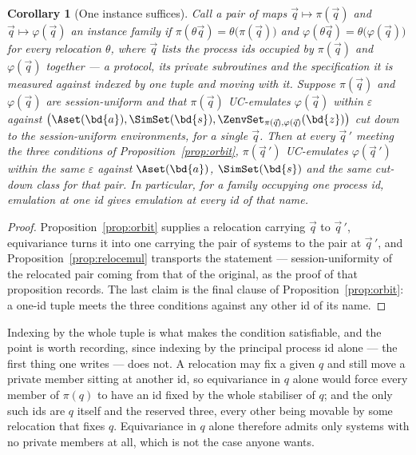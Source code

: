 \documentclass[10pt,oneside,openany]{book}
\theoremstyle{accentdef}
\theoremstyle{accentplain}
\newtheorem{corollary}[definition]{Corollary}
\begin{document}
\begin{corollary}[One instance suffices]\label{cor:onepid}
Call a pair of maps $\vec q \mapsto \pi(\vec q)$ and $\vec q \mapsto \varphi(\vec q)$ an
\emph{instance family} if $\pi(\theta\vec q) = \theta\bigl(\pi(\vec q)\bigr)$ and
$\varphi(\theta\vec q) = \theta\bigl(\varphi(\vec q)\bigr)$ for every relocation $\theta$, where
$\vec q$ lists the process ids occupied by $\pi(\vec q)$ and $\varphi(\vec q)$ together --- a
protocol, its private subroutines and the specification it is measured against indexed by one tuple
and moving with it. Suppose $\pi(\vec q)$ and $\varphi(\vec q)$ are session-uniform and that
$\pi(\vec q)$ UC-emulates $\varphi(\vec q)$ within $\varepsilon$ against
$\bigl(\Aset(\bd{a}),\SimSet(\bd{s}),\ZenvSet_{\pi(\vec q),\varphi(\vec q)}(\bd{z})\bigr)$ cut down to
the session-uniform environments, for a single $\vec q$. Then at every $\vec q\,'$ meeting the three
conditions of Proposition~\ref{prop:orbit}, $\pi(\vec q\,')$ UC-emulates $\varphi(\vec q\,')$ within
the same $\varepsilon$ against $\Aset(\bd{a})$, $\SimSet(\bd{s})$ and the same cut-down class for that
pair. In particular, for a family occupying one process id, emulation at one id gives emulation at
every id of that name.
\end{corollary}

\begin{proof}
Proposition~\ref{prop:orbit} supplies a relocation carrying $\vec q$ to $\vec q\,'$, equivariance
turns it into one carrying the pair of systems to the pair at $\vec q\,'$, and
Proposition~\ref{prop:relocemul} transports the statement --- session-uniformity of the relocated
pair coming from that of the original, as the proof of that proposition records. The last claim is the
final clause of Proposition~\ref{prop:orbit}: a one-id tuple meets the three conditions against any
other id of its name.
\end{proof}

Indexing by the whole tuple is what makes the condition satisfiable, and the point is worth
recording, since indexing by the principal process id alone --- the first thing one writes --- does
not. A relocation may fix a given $q$ and still move a private member sitting at another id, so
equivariance in $q$ alone would force every member of $\pi(q)$ to have an id fixed by the whole
stabiliser of $q$; and the only such ids are $q$ itself and the reserved three, every other being
movable by some relocation that fixes $q$. Equivariance in $q$ alone therefore admits only systems
with no private members at all, which is not the case anyone wants.
\end{document}
